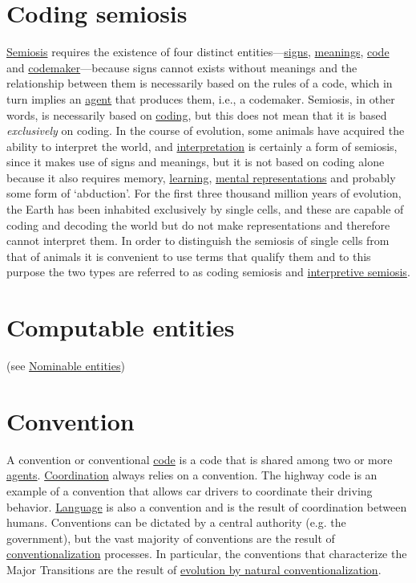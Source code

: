 \documentclass[12pt]{article}
\begin{document}
\section{Coding semiosis}
\hyperlink{semiosis}{Semiosis} requires the existence of four distinct entities---\hyperlink{signs}{signs}, \hyperlink{meaning}{meanings}, \hyperlink{code}{code} and \hyperlink{codemakers}{codemaker}---because signs cannot exists without meanings and the relationship between them is necessarily based on the rules of a code, which in turn implies an \hyperlink{agent}{agent} that produces them, i.e., a codemaker. Semiosis, in other words, is necessarily based on \hyperlink{copying_and_coding}{coding}, but this does not mean that it is based \textit{exclusively} on coding. In the course of evolution, some animals have acquired the ability to interpret the world, and \hyperlink{interpretation}{interpretation} is certainly a form of semiosis, since it makes use of signs and meanings, but it is not based on coding alone because it also requires memory, \hyperlink{learning}{learning}, \hyperlink{representations}{mental representations} and probably some form of `abduction'. For the first three thousand million years of evolution, the Earth has been inhabited exclusively by single cells, and these are capable of coding and decoding the world but do not make representations and therefore cannot interpret them. In order to distinguish the semiosis of single cells from that of animals it is convenient to use terms that qualify them and to this purpose the two types are referred to as coding semiosis and \hyperlink{interpretive_semiosis}{interpretive semiosis}.


\hypertarget{computable_entities}{}
\section{Computable entities} (see \hyperlink{nominable_entities}{Nominable entities})

\hypertarget{convention}{}
\section{Convention}

A convention or conventional \hyperlink{code}{code} is a code that is shared among two
or more \hyperlink{agent}{agents}. \hyperlink{coordination}{Coordination} always relies
on a convention. The highway code is an example of a convention that
allows car drivers to coordinate their driving behavior. \hyperlink{language}{Language} is
also a convention and is the result of coordination between
humans. Conventions can be dictated by a central authority (e.g. the
government), but the vast majority of conventions are the result of
\hyperlink{conventionalization}{conventionalization} processes. In
particular, the conventions that characterize the Major Transitions
are the result of \hyperlink{natural_conventionalization}{evolution by
  natural conventionalization}.
\end{document}
